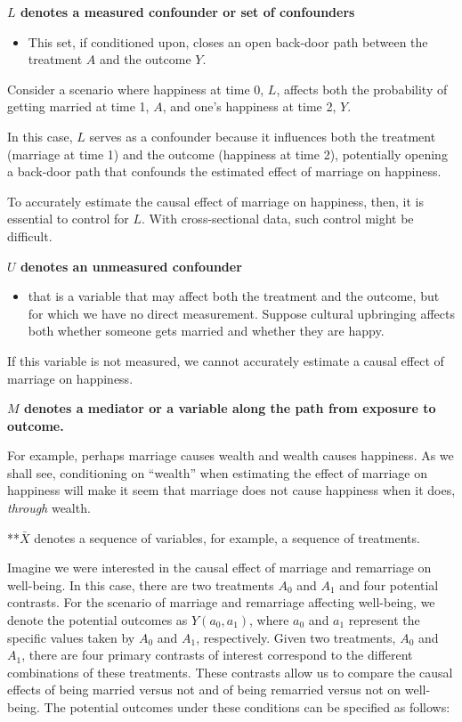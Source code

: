 \documentclass[
  single column]{article}
\providecommand{\tightlist}{%
  \setlength{\itemsep}{0pt}\setlength{\parskip}{0pt}}\usepackage{longtable,booktabs,array}
\begin{document}
\textbf{\(L\) denotes a measured confounder or set of confounders}

\begin{itemize}
\tightlist
\item
  This set, if conditioned upon, closes an open back-door path between
  the treatment \(A\) and the outcome \(Y\).
\end{itemize}

Consider a scenario where happiness at time 0, \(L\), affects both the
probability of getting married at time 1, \(A\), and one's happiness at
time 2, \(Y\).

In this case, \(L\) serves as a confounder because it influences both
the treatment (marriage at time 1) and the outcome (happiness at time
2), potentially opening a back-door path that confounds the estimated
effect of marriage on happiness.

To accurately estimate the causal effect of marriage on happiness, then,
it is essential to control for \(L\). With cross-sectional data, such
control might be difficult.

\textbf{\(U\) denotes an unmeasured confounder}

\begin{itemize}
\tightlist
\item
  that is a variable that may affect both the treatment and the outcome,
  but for which we have no direct measurement. Suppose cultural
  upbringing affects both whether someone gets married and whether they
  are happy.
\end{itemize}

If this variable is not measured, we cannot accurately estimate a causal
effect of marriage on happiness.

\textbf{\(M\) denotes a mediator or a variable along the path from
exposure to outcome.}

For example, perhaps marriage causes wealth and wealth causes happiness.
As we shall see, conditioning on ``wealth'' when estimating the effect
of marriage on happiness will make it seem that marriage does not cause
happiness when it does, \emph{through} wealth.

**\(\bar{X}\) denotes a sequence of variables, for example, a sequence
of treatments.

Imagine we were interested in the causal effect of marriage and
remarriage on well-being. In this case, there are two treatments \(A_0\)
and \(A_1\) and four potential contrasts. For the scenario of marriage
and remarriage affecting well-being, we denote the potential outcomes as
\(Y(a_0, a_1)\), where \(a_0\) and \(a_1\) represent the specific values
taken by \(A_0\) and \(A_1\), respectively. Given two treatments,
\(A_0\) and \(A_1\), there are four primary contrasts of interest
correspond to the different combinations of these treatments. These
contrasts allow us to compare the causal effects of being married versus
not and of being remarried versus not on well-being. The potential
outcomes under these conditions can be specified as follows:
\end{document}
